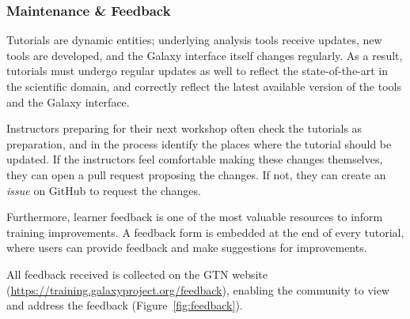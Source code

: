 \documentclass[10pt,letterpaper]{article}
\begin{document}
\subsubsection*{Maintenance \& Feedback}

Tutorials are dynamic entities; underlying analysis tools receive updates, new tools are developed, and the Galaxy interface itself changes regularly.
As a result, tutorials must undergo regular updates as well to reflect the state-of-the-art in the scientific domain, and correctly reflect the latest available version of the tools and the Galaxy interface.

Instructors preparing for their next workshop often check the tutorials as preparation, and in the process identify the places where the tutorial should be updated.
If the instructors feel comfortable making these changes themselves, they can open a pull request proposing the changes.
If not, they can create an \emph{issue} on GitHub to request the changes.

Furthermore, learner feedback is one of the most valuable resources to inform training improvements.
A feedback form is embedded at the end of every tutorial, where users can provide feedback and make suggestions for improvements. 

All feedback received is collected on the GTN website (\url{https://training.galaxyproject.org/feedback}), enabling the community to view and address the feedback (Figure~\ref{fig:feedback}).
\end{document}

